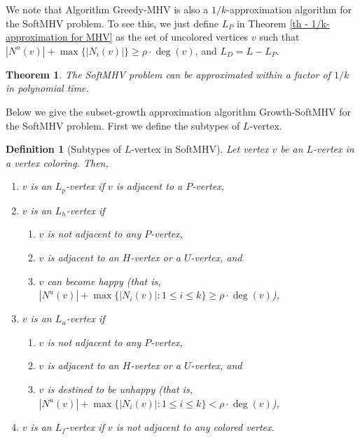 \documentclass[11pt]{article}
\newtheorem{theorem}{Theorem}[section]
\newtheorem{definition}{Definition}[section]
\newcommand{\qed}{\vrule height4pt width4pt depth2pt}
\begin{document}
We note that Algorithm {\sc Greedy-MHV} is also a $1/k$-approximation
algorithm for the SoftMHV problem. To see this, we just define $L_P$
in Theorem \ref{th - 1/k-approximation for MHV} as the set of uncolored
vertices $v$ such that $|N^u(v)| + \max \{|N_i(v)|\} \geq \rho \cdot \deg(v)$,
and $L_D = L - L_P$.

\begin{theorem}
The SoftMHV problem can be approximated within a factor of $1/k$
in polynomial time. \qed
\end{theorem}

Below we give the subset-growth approximation algorithm {\sc Growth-SoftMHV}
for the SoftMHV problem. First we define the subtypes of $L$-vertex.

\begin{definition}[Subtypes of $L$-vertex in SoftMHV]
Let vertex $v$ be an $L$-vertex in a vertex coloring. Then,
\begin{enumerate}
\item $v$ is an $L_p$-vertex if $v$ is adjacent to a $P$-vertex,

\item $v$ is an $L_{h}$-vertex if
\begin{enumerate}
\item $v$ is not adjacent to any $P$-vertex,
\item $v$ is adjacent to an $H$-vertex or a $U$-vertex, and
\item $v$ can become happy (that is,
$|N^u(v)| + \max \{|N_i(v)| \colon 1 \leq i \leq k \} \geq \rho \cdot \deg(v)$),
\end{enumerate}

\item $v$ is an $L_{u}$-vertex if
\begin{enumerate}
\item $v$ is not adjacent to any $P$-vertex,
\item $v$ is adjacent to an $H$-vertex or a $U$-vertex, and
\item $v$ is destined to be unhappy (that is,
$|N^u(v)| + \max \{|N_i(v)| \colon 1 \leq i \leq k \} < \rho \cdot \deg(v)$),
\end{enumerate}

\item $v$ is an $L_f$-vertex if $v$ is not adjacent to any colored
vertex.
\end{enumerate}
\end{definition}
\end{document}
